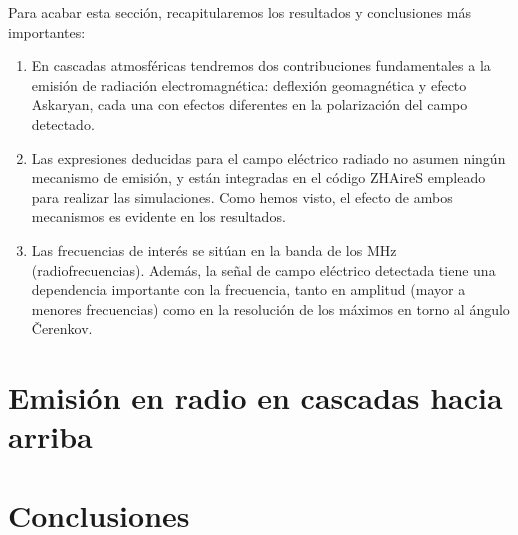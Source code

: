 \documentclass[12 pt, a4paper]{article} %
\numberwithin{equation}{section}
\numberwithin{figure}{section}
\numberwithin{table}{section}
\begin{document}
Para acabar esta sección, recapitularemos los resultados y conclusiones más importantes:
\begin{enumerate}
	\item En cascadas atmosféricas tendremos dos contribuciones fundamentales a la emisión de radiación electromagnética: deflexión geomagnética y efecto Askaryan, cada una con efectos diferentes en la polarización del campo detectado.
	\item Las expresiones deducidas para el campo eléctrico radiado no asumen ningún mecanismo de emisión, y están integradas en el código ZHAireS empleado para realizar las simulaciones. Como hemos visto, el efecto de ambos mecanismos es evidente en los resultados.
	\item Las frecuencias de interés se sitúan en la banda de los $\mathrm{MHz}$ (radiofrecuencias). Además, la señal de campo eléctrico detectada tiene una dependencia importante con la frecuencia, tanto en amplitud (mayor a menores frecuencias) como en la resolución de los máximos en torno al ángulo \v{C}erenkov.
\end{enumerate}

	\clearpage

	\section{Emisión en radio en cascadas hacia arriba}
	\clearpage %
	\section{Conclusiones}
	
	
	\clearpage
	\appendix
	
	\nocite{*}
	
	

	
\end{document}
